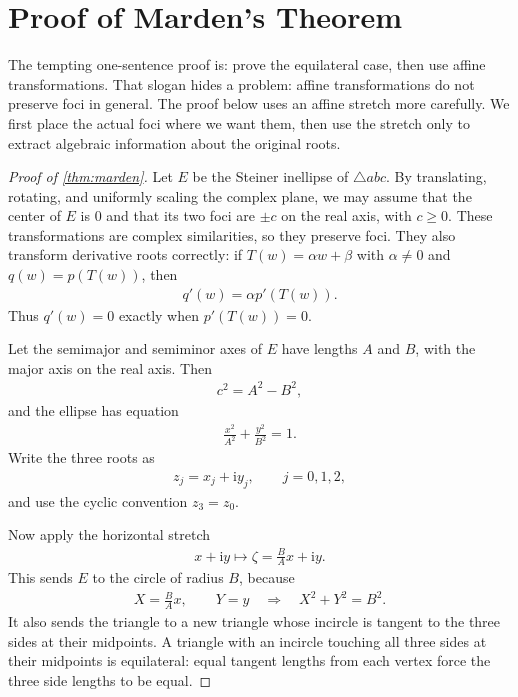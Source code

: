 \documentclass[11pt]{article}
\newcommand{\ii}{\mathrm{i}}
\begin{document}
\section{Proof of Marden's Theorem}

The tempting one-sentence proof is: prove the equilateral case, then use affine transformations. That slogan hides a problem: affine transformations do not preserve foci in general. The proof below uses an affine stretch more carefully. We first place the actual foci where we want them, then use the stretch only to extract algebraic information about the original roots.

\begin{proof}[Proof of \cref{thm:marden}]
Let \(E\) be the Steiner inellipse of \(\triangle abc\). By translating, rotating, and uniformly scaling the complex plane, we may assume that the center of \(E\) is \(0\) and that its two foci are \(\pm c\) on the real axis, with \(c\ge 0\). These transformations are complex similarities, so they preserve foci. They also transform derivative roots correctly: if \(T(w)=\alpha w+\beta\) with \(\alpha\ne0\) and \(q(w)=p(T(w))\), then
\begin{align}
  q'(w)=\alpha p'(T(w)).
\end{align}
Thus \(q'(w)=0\) exactly when \(p'(T(w))=0\).

Let the semimajor and semiminor axes of \(E\) have lengths \(A\) and \(B\), with the major axis on the real axis. Then
\begin{align}
  c^2=A^2-B^2,
  \label{eq:focal-length}
\end{align}
and the ellipse has equation
\begin{align}
  \frac{x^2}{A^2}+\frac{y^2}{B^2}=1.
\end{align}
Write the three roots as
\begin{align}
  z_j=x_j+\ii y_j,\qquad j=0,1,2,
\end{align}
and use the cyclic convention \(z_3=z_0\).

Now apply the horizontal stretch
\begin{align}
  x+\ii y\longmapsto \zeta=\frac{B}{A}x+\ii y.
  \label{eq:horizontal-stretch}
\end{align}
This sends \(E\) to the circle of radius \(B\), because
\begin{align}
  X=\frac{B}{A}x,\qquad Y=y
  \quad\Longrightarrow\quad
  X^2+Y^2=B^2.
\end{align}
It also sends the triangle to a new triangle whose incircle is tangent to the three sides at their midpoints. A triangle with an incircle touching all three sides at their midpoints is equilateral: equal tangent lengths from each vertex force the three side lengths to be equal.


\end{proof}
\end{document}
